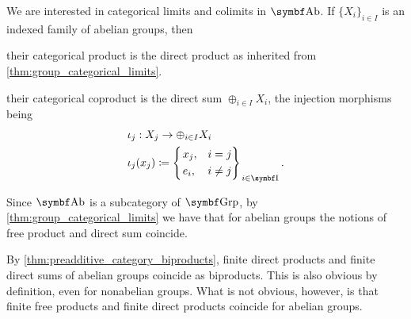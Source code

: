 \begin{proposition}\label{thm:abelian_group_categorical_limits}
  We are interested in categorical limits and colimits in \( \Cat{Ab} \). If \( \{ X_i \}_{i \in I} \) is an indexed family of abelian groups, then
  \begin{defenum}
     their categorical product is the direct product as inherited from \cref{thm:group_categorical_limits}.

     their categorical coproduct is the direct sum \( \oplus_{i \in I} X_i \), the injection morphisms being
    \begin{align*}
      &\iota_j: X_j \to \oplus_{i \in I} X_i \\
      &\iota_j(x_j) \coloneqq \begin{dcases}
        \begin{drcases}
          x_j, &i = j \\
          e_i, &i \neq j
        \end{drcases}
      \end{dcases}_{i \in \Bold I}.
    \end{align*}

    Since \( \Cat{Ab} \) is a subcategory of \( \Cat{Grp} \), by \cref{thm:group_categorical_limits} we have that for abelian groups the notions of free product and direct sum coincide.
  \end{defenum}
\end{proposition}

\begin{remark}\label{remark:abelian_group_biproducts}
  By \cref{thm:preadditive_category_biproducts}, finite direct products and finite direct sums of abelian groups coincide as biproducts. This is also obvious by definition, even for nonabelian groups. What is not obvious, however, is that finite free products and finite direct products coincide for abelian groups.
\end{remark}

